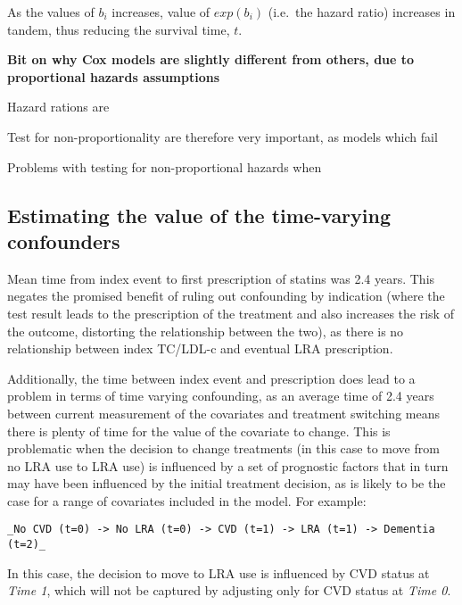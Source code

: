 \documentclass[a4paper, twoside]{templates/ociamthesis}
\begin{document}
As the values of \(b_i\) increases, value of \(exp(b_i)\) (i.e.~the hazard ratio) increases in tandem, thus reducing the survival time, \(t\).

\textbf{Bit on why Cox models are slightly different from others, due to proportional hazards assumptions}

Hazard rations are

Test for non-proportionality are therefore very important, as models which fail

Problems with testing for non-proportional hazards when





\hypertarget{estimating-the-value-of-the-time-varying-confounders}{%
\subsection{Estimating the value of the time-varying confounders}\label{estimating-the-value-of-the-time-varying-confounders}}

Mean time from index event to first prescription of statins was 2.4 years. This negates the promised benefit of ruling out confounding by indication (where the test result leads to the prescription of the treatment and also increases the risk of the outcome, distorting the relationship between the two), as there is no relationship between index TC/LDL-c and eventual LRA prescription.

Additionally, the time between index event and prescription does lead to a problem in terms of time varying confounding, as an average time of 2.4 years between current measurement of the covariates and treatment switching means there is plenty of time for the value of the covariate to change. This is problematic when the decision to change treatments (in this case to move from no LRA use to LRA use) is influenced by a set of prognostic factors that in turn may have been influenced by the initial treatment decision, as is likely to be the case for a range of covariates included in the model. For example:

\begin{verbatim}
_No CVD (t=0) -> No LRA (t=0) -> CVD (t=1) -> LRA (t=1) -> Dementia (t=2)_
\end{verbatim}

In this case, the decision to move to LRA use is influenced by CVD status at \emph{Time 1}, which will not be captured by adjusting only for CVD status at \emph{Time 0}.
\end{document}
